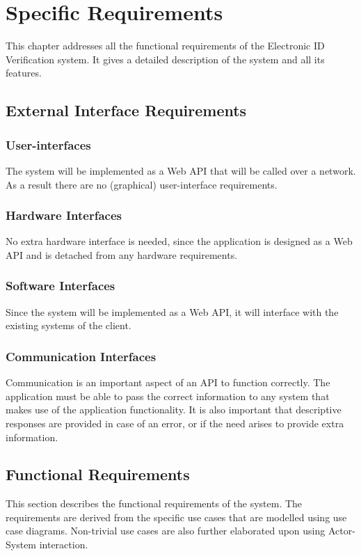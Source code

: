 \documentclass{article}
\def \project{Electronic ID Verification }
\begin{document}
	\cleardoublepage

	\section{Specific Requirements}\label{sec:specific-requirements}
		This chapter addresses all the functional requirements of the \project system. It gives a detailed description of the system and all its features.

		\subsection{External Interface Requirements}\label{subsec:specific-external}
		\subsubsection{User-interfaces}
		The system will be implemented as a Web API that will be called over a network. As a result there are no (graphical) user-interface requirements.
		\subsubsection{Hardware Interfaces}
		No extra hardware interface is needed, since the application is designed as a Web API and is detached from any hardware requirements.
		\subsubsection{Software Interfaces}
		Since the system will be implemented as a Web API, it will interface with the existing systems of the client.
		\subsubsection{Communication Interfaces}
		Communication is an important aspect of an API to function correctly. The application must be able to pass the correct information to any system that makes use of the application functionality. It is also important that descriptive responses are provided in case of an error, or if the need arises to provide extra information.\\
			

		\subsection{Functional Requirements}\label{subsec:specific-functional}
		This section describes the functional requirements of the system. The requirements are derived from the specific use cases that are modelled using use case diagrams. Non-trivial use cases are also further elaborated upon using Actor-System interaction.
		
\end{document}
